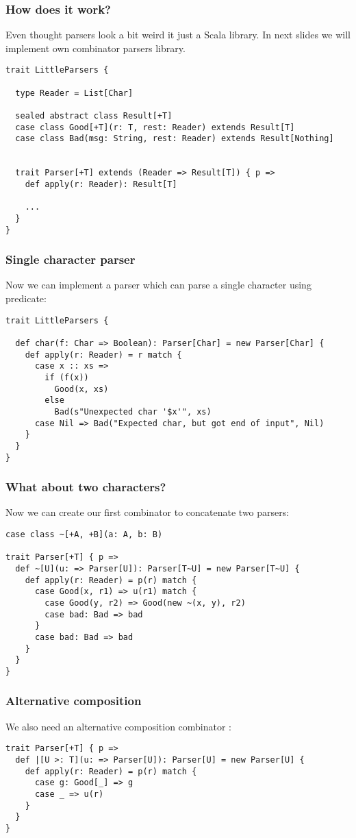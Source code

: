 \documentclass[t]{beamer}
\begin{document}
\begin{frame}[fragile]
\frametitle{How does it work?}
Even thought parsers look a bit weird it just a Scala library.  In next slides we will
implement own combinator parsers library.
\begin{lstlisting}
trait LittleParsers {

  type Reader = List[Char]

  sealed abstract class Result[+T]
  case class Good[+T](r: T, rest: Reader) extends Result[T]
  case class Bad(msg: String, rest: Reader) extends Result[Nothing]


  trait Parser[+T] extends (Reader => Result[T]) { p =>
    def apply(r: Reader): Result[T]

    ...
  }
}
\end{lstlisting}
\end{frame}

\begin{frame}[fragile]
\frametitle{Single character parser}
Now we can implement a parser which can parse a single character using predicate:
\begin{lstlisting}
trait LittleParsers {

  def char(f: Char => Boolean): Parser[Char] = new Parser[Char] {
    def apply(r: Reader) = r match {
      case x :: xs =>
        if (f(x))
          Good(x, xs)
        else
          Bad(s"Unexpected char '$x'", xs)
      case Nil => Bad("Expected char, but got end of input", Nil)
    }
  }
}
\end{lstlisting}
\end{frame}

\begin{frame}[fragile]
\frametitle{What about two characters?}
Now we can create our first combinator \linline{~} to concatenate two parsers:
\begin{lstlisting}
case class ~[+A, +B](a: A, b: B)

trait Parser[+T] { p =>
  def ~[U](u: => Parser[U]): Parser[T~U] = new Parser[T~U] {
    def apply(r: Reader) = p(r) match {
      case Good(x, r1) => u(r1) match {
        case Good(y, r2) => Good(new ~(x, y), r2)
        case bad: Bad => bad
      }
      case bad: Bad => bad
    }
  }
}
\end{lstlisting}
\end{frame}

\begin{frame}[fragile]
\frametitle{Alternative composition}
We also need an alternative composition combinator \linline{|}:
\begin{lstlisting}
trait Parser[+T] { p =>
  def |[U >: T](u: => Parser[U]): Parser[U] = new Parser[U] {
    def apply(r: Reader) = p(r) match {
      case g: Good[_] => g
      case _ => u(r)
    }
  }
}
\end{lstlisting}
\end{frame}
\end{document}
